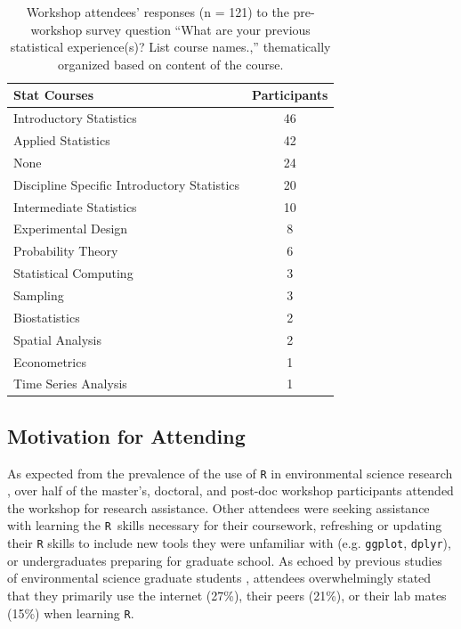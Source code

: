 \documentclass[12pt]{article}
\newcommand{\R}{\texttt{R}}
\begin{document}
{
\begin{table}[h!]
    \centering
    \begin{tabular}{lc}
\hline
Stat Courses & Participants \\
\hline
Introductory Statistics & 46 \\
Applied Statistics & 42 \\
None & 24 \\
Discipline Specific Introductory Statistics & 20 \\
Intermediate Statistics & 10 \\
Experimental Design	& 8 \\
Probability Theory	& 6 \\
Statistical Computing & 3 \\
Sampling & 3 \\
Biostatistics & 2 \\
Spatial Analysis & 2 \\
Econometrics & 1 \\
Time Series Analysis & 1 \\
\hline
\end{tabular}
\caption{Workshop attendees' responses (n = 121) to the pre-workshop survey
question ``What are your previous statistical experience(s)?  List course
names.,'' thematically organized based on content of the course.}
\label{tab:statistics}
\end{table}
}

\subsection{Motivation for Attending} 

\noindent As expected from the prevalence of the use of \texttt{R} in environmental
science research \citep{Rpopular, mislan}, over half of the master's, doctoral, 
and post-doc workshop participants attended the workshop for research
assistance. Other attendees were seeking assistance with learning the \R~skills
necessary for their coursework, refreshing or updating their \texttt{R}
skills to include new tools they were unfamiliar with (e.g. \texttt{ggplot}, 
\texttt{dplyr}), or undergraduates preparing for graduate school. As echoed by
previous studies of environmental science graduate students \citep{carpentry,
theobold}, attendees overwhelmingly stated that they primarily use the internet
(27\%), their peers (21\%), or their lab mates (15\%) when learning \texttt{R}.

\end{document}
